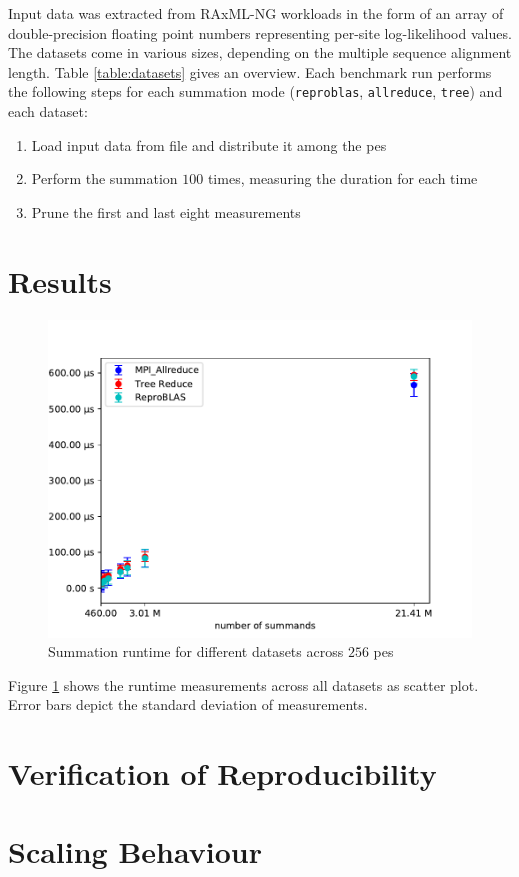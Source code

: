 Input data was extracted from RAxML-NG workloads in the form of an array of double-precision floating point numbers representing per-site log-likelihood values.
The datasets come in various sizes, depending on the multiple sequence alignment length. Table \ref{table:datasets} gives an overview.
Each benchmark run performs the following steps for each summation mode (\texttt{reproblas}, \texttt{allreduce}, \texttt{tree}) and each dataset:
\begin{enumerate}
\item Load input data from file and distribute it among the \glspl{pe}
\item Perform the summation $100$ times, measuring the duration for each time
\item Prune the first and last eight measurements
\end{enumerate}

\section{Results}
\label{sec:Results}

\begin{figure}
\includegraphics[scale=1]{figures/benchmarkScatter.pdf}
\caption{Summation runtime for different datasets across $256$ \glspl{pe}}
\label{fig:benchmarkOverview}
\end{figure}

Figure \ref{fig:benchmarkOverview} shows the runtime measurements across all datasets as scatter plot.
Error bars depict the standard deviation of measurements.



\section{Verification of Reproducibility}
\label{sec:VerificationOfReproducibility}

\section{Scaling Behaviour}
\label{sec:ScalingBehaviour}